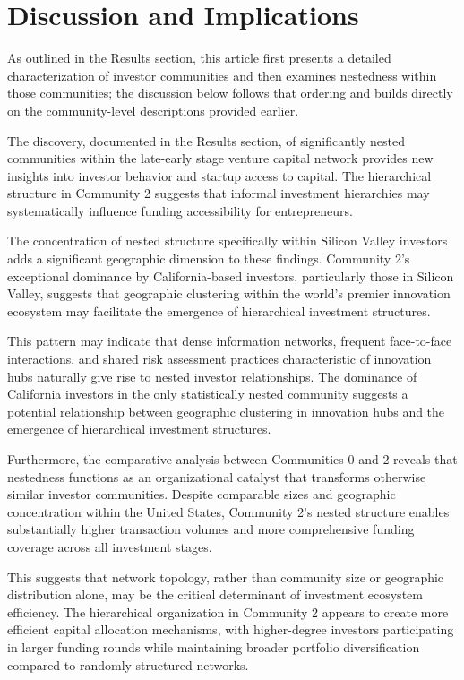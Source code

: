 \section{Discussion and Implications}

As outlined in the Results section, this article first presents a detailed characterization of investor communities and then examines nestedness within those communities; the discussion below follows that ordering and builds directly on the community-level descriptions provided earlier.

The discovery, documented in the Results section, of significantly nested communities within the late-early stage venture capital network provides new insights into investor behavior and startup access to capital. The hierarchical structure in Community 2 suggests that informal investment hierarchies may systematically influence funding accessibility for entrepreneurs.

The concentration of nested structure specifically within Silicon Valley investors adds a significant geographic dimension to these findings. Community 2's exceptional dominance by California-based investors, particularly those in Silicon Valley, suggests that geographic clustering within the world's premier innovation ecosystem may facilitate the emergence of hierarchical investment structures. 

This pattern may indicate that dense information networks, frequent face-to-face interactions, and shared risk assessment practices characteristic of innovation hubs naturally give rise to nested investor relationships. The dominance of California investors in the only statistically nested community suggests a potential relationship between geographic clustering in innovation hubs and the emergence of hierarchical investment structures.

Furthermore, the comparative analysis between Communities 0 and 2 reveals that nestedness functions as an organizational catalyst that transforms otherwise similar investor communities. Despite comparable sizes and geographic concentration within the United States, Community 2's nested structure enables substantially higher transaction volumes and more comprehensive funding coverage across all investment stages. 

This suggests that network topology, rather than community size or geographic distribution alone, may be the critical determinant of investment ecosystem efficiency. The hierarchical organization in Community 2 appears to create more efficient capital allocation mechanisms, with higher-degree investors participating in larger funding rounds while maintaining broader portfolio diversification compared to randomly structured networks.

